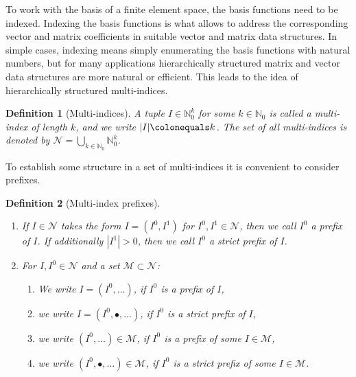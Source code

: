\documentclass[a4paper,10pt,headings=normal,bibliography=totoc]{scrartcl}
\newtheorem{definition}{Definition}
\newcommand{\N}{\mathbb{N}}
\begin{document}
To work with the basis of a finite element space, the basis functions need to be indexed.  Indexing the basis functions
is what allows to address the corresponding vector and matrix coefficients in suitable vector and matrix data structures.
In simple cases, indexing means simply enumerating the basis functions with natural numbers, but for many applications
hierarchically structured matrix and vector data structures are more natural or efficient.  This leads to the idea
of hierarchically structured multi-indices.
%
\begin{definition}[Multi-indices]
 A tuple $I \in \N_0^k$ for some $k \in \N_0$ is called a multi-index of length $k$,
 and we write $|I| \colonequals k$.
 The set of all multi-indices is denoted by
 $\mathcal{N} = \bigcup_{k \in \N_0} \N_0^k$.
\end{definition}
%
To establish some structure in a set of multi-indices it is convenient to consider prefixes.
%
\begin{definition}[Multi-index prefixes]\mbox{}  %
    \begin{enumerate}
        \item
            If $I \in \mathcal{N}$ takes the form $I = (I^0,I^1)$ for $I^0,I^1 \in \mathcal{N}$,
            then we call $I^0$ a prefix of $I$.
            If additionally $|I^1|>0$, then we call $I^0$ a strict prefix of $I$.
        \item
            For $I,I^0 \in \mathcal{N}$ and a set $\mathcal{M} \subset \mathcal{N}$:
            \begin{enumerate}
              \item
                We write $I=(I^0,\dots)$, if $I^0$ is a prefix of $I$,
              \item
                we write $I=(I^0,\bullet,\dots)$, if $I^0$ is a strict prefix of $I$,
              \item
                we write $(I^0,\dots) \in \mathcal{M}$, if $I^0$ is a prefix of some
                $I \in \mathcal{M}$,
              \item
                we write $(I^0,\bullet,\dots) \in \mathcal{M}$, if $I^0$ is a strict prefix of some
                $I \in \mathcal{M}$.
            \end{enumerate}
    \end{enumerate}
\end{definition}
\end{document}
